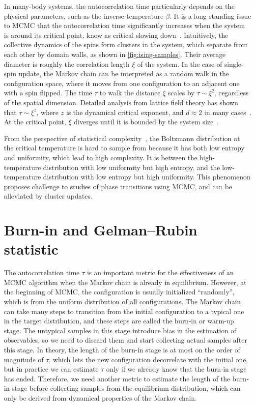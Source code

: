 In many-body systems, the autocorrelation time particularly depends on the physical parameters, such as the inverse temperature $\beta$. It is a long-standing issue to MCMC that the autocorrelation time significantly increases when the system is around its critical point, know as critical slowing down~\cite{goodman1989multigrid, wolff1990critical}. Intuitively, the collective dynamics of the spins form clusters in the system, which separate from each other by domain walls, as shown in \cref{fig:ising-samples}. Their average diameter is roughly the correlation length $\xi$ of the system. In the case of single-spin update, the Markov chain can be interpreted as a random walk in the configuration space, where it moves from one configuration to an adjacent one with a spin flipped. The time $\tau$ to walk the distance $\xi$ scales by $\tau \sim \xi^2$, regardless of the spatial dimension. Detailed analysis from lattice field theory has shown that $\tau \sim \xi^z$, where $z$ is the dynamical critical exponent, and $d \approx 2$ in many cases~\cite{hohenberg1977theory}. At the critical point, $\xi$ diverges until it is bounded by the system size~\cite{lubetzky2012critical}.

From the perspective of statistical complexity~\cite{lopez1995statistical}, the Boltzmann distribution at the critical temperature is hard to sample from because it has both low entropy and uniformity, which lead to high complexity. It is between the high-temperature distribution with low uniformity but high entropy, and the low-temperature distribution with low entropy but high uniformity. This phenomenon proposes challenge to studies of phase transitions using MCMC, and can be alleviated by cluster updates.

\section{Burn-in and Gelman--Rubin statistic}

The autocorrelation time $\tau$ is an important metric for the effectiveness of an MCMC algorithm when the Markov chain is already in equilibrium. However, at the beginning of MCMC, the configuration is usually initialized ``randomly'', which is from the uniform distribution of all configurations. The Markov chain can take many steps to transition from the initial configuration to a typical one in the target distribution, and these steps are called the burn-in or warm-up stage. The untypical samples in this stage introduce bias in the estimation of observables, so we need to discard them and start collecting actual samples after this stage. In theory, the length of the burn-in stage is at most on the order of magnitude of $\tau$, which lets the new configuration decorrelate with the initial one, but in practice we can estimate $\tau$ only if we already know that the burn-in stage has ended. Therefore, we need another metric to estimate the length of the burn-in stage before collecting samples from the equilibrium distribution, which can only be derived from dynamical properties of the Markov chain.

